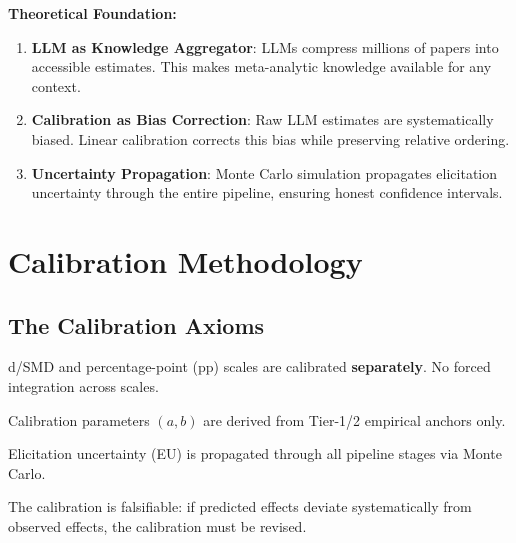 \textbf{Theoretical Foundation:}
\begin{enumerate}
\item \textbf{LLM as Knowledge Aggregator}: LLMs compress millions of papers into
accessible estimates. This makes meta-analytic knowledge available for any context.
\item \textbf{Calibration as Bias Correction}: Raw LLM estimates are systematically
biased. Linear calibration corrects this bias while preserving relative ordering.
\item \textbf{Uncertainty Propagation}: Monte Carlo simulation propagates elicitation
uncertainty through the entire pipeline, ensuring honest confidence intervals.
\end{enumerate}


\section{Calibration Methodology}
\label{sec:iii-calibration}

\subsection{The Calibration Axioms}

\begin{tcolorbox}[colback=red!5!white, colframe=red!75!black,
    title=Axiom UNMAPPED_CAL-1: Scale-Local Calibration]
d/SMD and percentage-point (pp) scales are calibrated \textbf{separately}.
No forced integration across scales.
\end{tcolorbox}

\begin{tcolorbox}[colback=red!5!white, colframe=red!75!black,
    title=Axiom UNMAPPED_CAL-2: Empirical Anchoring]
Calibration parameters $(a, b)$ are derived from Tier-1/2 empirical anchors only.
\end{tcolorbox}

\begin{tcolorbox}[colback=red!5!white, colframe=red!75!black,
    title=Axiom UNMAPPED_CAL-3: Uncertainty Propagation]
Elicitation uncertainty (EU) is propagated through all pipeline stages via Monte Carlo.
\end{tcolorbox}

\begin{tcolorbox}[colback=red!5!white, colframe=red!75!black,
    title=Axiom UNMAPPED_CAL-4: Falsifiability]
The calibration is falsifiable: if predicted effects deviate systematically from
observed effects, the calibration must be revised.
\end{tcolorbox}

